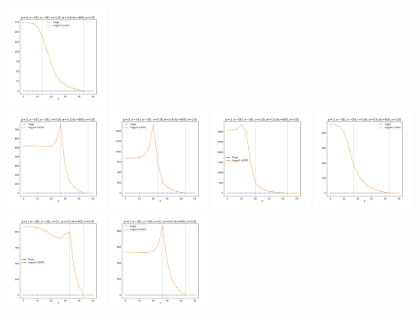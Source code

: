 \documentclass[a4paper]{article}
\begin{document}
\begin{figure}[H]
  \includegraphics[width=0.23\textwidth]{grid-g5-v2-w4_0}
  \\
  \includegraphics[width=0.23\textwidth]{grid-g5-v3-w1_0}
  \includegraphics[width=0.23\textwidth]{grid-g5-v3-w2_0}
  \includegraphics[width=0.23\textwidth]{grid-g5-v3-w3_0}
  \includegraphics[width=0.23\textwidth]{grid-g5-v3-w4_0}
  \\
  \includegraphics[width=0.23\textwidth]{grid-g5-v4-w1_0}
  \includegraphics[width=0.23\textwidth]{grid-g5-v4-w2_0}

\end{figure}
\end{document}
